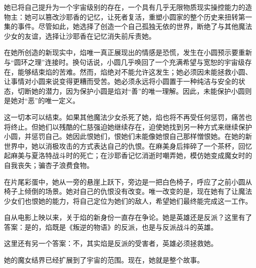 她已将自己提升为一个宇宙级别的存在，一个具有几乎无限物质现实操控能力的造物主：她可以篡改沙耶香的记忆，让死者复活，重塑小圆家的整个历史来扭转第一集的事件。尽管如此，她选择了创造一个自己孤独无依的世界，断绝了与其他魔法少女的友谊，选择让沙耶香在记忆消失前斥责她。

在她所创造的新现实中，焰唯一真正展现出的情感是恐慌，发生在小圆预示要重新与“圆环之理”连接时。换句话说，小圆几乎唤回了一个充满希望与宽恕的宇宙级存在，能够结束焰的苦难。然而，焰绝对不能允许这发生；她必须因未能拯救小圆、让事情对小圆来说变得更糟而受苦。她必须永远将小圆置于一种纯洁与安全的状态，切断她的潜力，因为保护小圆是焰对“善”的唯一理解。因此，未能保护小圆则是她对“恶”的唯一定义。

这一切本可以结束。如果其他魔法少女杀死了她，焰也将不再受任何惩罚，痛苦也将终止。但她们以残酷的仁慈强迫她继续存在，迫使她找到另一种方式来继续保护小圆，并惩罚自己。她因此恨她们，恨她们未能像她恨自己那样憎恨她。在她的新世界中，她以消极攻击的方式表达自己的仇恨。在麻美身后摔碎了一个茶杯，回忆起麻美与夏洛特战斗时的死亡；在沙耶香记忆消逝时嘲弄她，模仿她变成魔女时的自我丧失；骗杏子浪费食物。

在片尾彩蛋中，她从一旁的悬崖上跃下，旁边是一把白色椅子，呼应了之前小圆从椅子上倾倒的场景。她对自己的仇恨没有改变。唯一改变的是，现在她有了让魔法少女们也恨她的能力，将自己定位为她们的敌人，希望她们最终能完成这一工作。

自从电影上映以来，关于焰的新身份一直存在争论。她是英雄还是反派？这里有了答案：是的，焰既是《叛逆的物语》的反派，也是与反派战斗的英雄。

这里还有另一个答案：不，其实焰是反派的受害者，英雄必须拯救她。

她的魔女结界已经扩展到了宇宙的范围。现在，她就是整个故事。